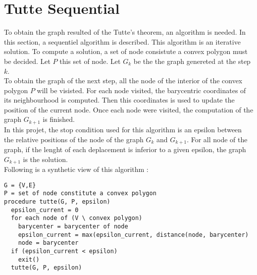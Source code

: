 \section{Tutte Sequential}

To obtain the graph resulted of the Tutte's theorem, an algorithm is
needed. In this section, a sequentiel algorithm is described. This
algorithm is an iterative solution. To compute a solution, a set of node
consistute a convex polygon must be decided. Let $P$ this set of node. Let
$G_k$ be the the graph genereted at the step $k$.
\\

To obtain the graph of the next step, all the node of the interior of the
convex polygon $P$ will be visisted. For each node visited, the barycentric
coordinates of its neighbourhood is computed. Then this coordinates is used
to update the position of the current node. Once each node were visited,
the computation of the graph $G_{k+1}$ is finished.
\\
In this projet, the stop condition used for this algorithm is an epsilon
between the relative positions of the node of the graph $G_k$ and
$G_{k+1}$. For all node of the graph, if the lenght of each deplacement is
inferior to a given epsilon, the graph $G_{k+1}$ is the solution.
\\

Following is a synthetic view of this algorithm : 
\begin{verbatim}
G = {V,E}
P = set of node constitute a convex polygon
procedure tutte(G, P, epsilon)
  epsilon_current = 0
  for each node of (V \ convex polygon)
    barycenter = barycenter of node
    epsilon_current = max(epsilon_current, distance(node, barycenter)
    node = barycenter
  if (epsilon_current < epsilon)
    exit()
  tutte(G, P, epsilon)
\end{verbatim}


